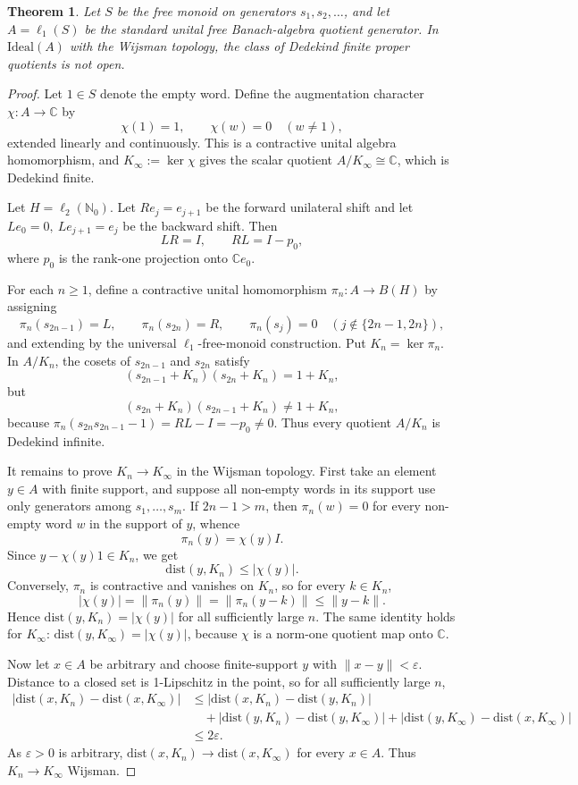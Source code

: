 \documentclass[11pt]{article}
\newtheorem{theorem}{Theorem}
\newcommand{\N}{\mathbb N}
\newcommand{\C}{\mathbb C}
\newcommand{\Ideal}{\mathrm{Ideal}}
\newcommand{\dist}{\mathrm{dist}}
\begin{document}
\begin{theorem}
Let \(S\) be the free monoid on generators \(s_1,s_2,\ldots\), and let
\(A=\ell_1(S)\) be the standard unital free Banach-algebra quotient generator.
In \(\Ideal(A)\) with the Wijsman topology, the class of Dedekind finite
proper quotients is not open.
\end{theorem}

\begin{proof}
Let \(1\in S\) denote the empty word.  Define the augmentation character
\(\chi:A\to\C\) by
\[
        \chi(1)=1,\qquad \chi(w)=0\quad(w\ne 1),
\]
extended linearly and continuously.  This is a contractive unital algebra
homomorphism, and \(K_\infty:=\ker\chi\) gives the scalar quotient
\(A/K_\infty\cong\C\), which is Dedekind finite.

Let \(H=\ell_2(\N_0)\).  Let \(R e_j=e_{j+1}\) be the forward unilateral
shift and let \(L e_0=0,\ L e_{j+1}=e_j\) be the backward shift.  Then
\[
        LR=I,\qquad RL=I-p_0,
\]
where \(p_0\) is the rank-one projection onto \(\C e_0\).

For each \(n\ge 1\), define a contractive unital homomorphism
\(\pi_n:A\to B(H)\) by assigning
\[
        \pi_n(s_{2n-1})=L,\qquad
        \pi_n(s_{2n})=R,\qquad
        \pi_n(s_j)=0\quad(j\notin\{2n-1,2n\}),
\]
and extending by the universal \(\ell_1\)-free-monoid construction.  Put
\(K_n=\ker\pi_n\).  In \(A/K_n\), the cosets of \(s_{2n-1}\) and \(s_{2n}\)
satisfy
\[
        (s_{2n-1}+K_n)(s_{2n}+K_n)=1+K_n,
\]
but
\[
        (s_{2n}+K_n)(s_{2n-1}+K_n)\ne 1+K_n,
\]
because \(\pi_n(s_{2n}s_{2n-1}-1)=RL-I=-p_0\ne0\).  Thus every quotient
\(A/K_n\) is Dedekind infinite.

It remains to prove \(K_n\to K_\infty\) in the Wijsman topology.  First take
an element \(y\in A\) with finite support, and suppose all non-empty words in
its support use only generators among \(s_1,\ldots,s_m\).  If \(2n-1>m\), then
\(\pi_n(w)=0\) for every non-empty word \(w\) in the support of \(y\), whence
\[
        \pi_n(y)=\chi(y)I.
\]
Since \(y-\chi(y)1\in K_n\), we get
\[
        \dist(y,K_n)\le |\chi(y)|.
\]
Conversely, \(\pi_n\) is contractive and vanishes on \(K_n\), so for every
\(k\in K_n\),
\[
        |\chi(y)|=\|\pi_n(y)\|=\|\pi_n(y-k)\|\le \|y-k\|.
\]
Hence \(\dist(y,K_n)=|\chi(y)|\) for all sufficiently large \(n\).  The same
identity holds for \(K_\infty\): \(\dist(y,K_\infty)=|\chi(y)|\), because
\(\chi\) is a norm-one quotient map onto \(\C\).

Now let \(x\in A\) be arbitrary and choose finite-support \(y\) with
\(\|x-y\|<\varepsilon\).  Distance to a closed set is 1-Lipschitz in the
point, so for all sufficiently large \(n\),
\[
\begin{aligned}
|\dist(x,K_n)-\dist(x,K_\infty)|
&\le |\dist(x,K_n)-\dist(y,K_n)| \\
&\quad + |\dist(y,K_n)-\dist(y,K_\infty)|
      + |\dist(y,K_\infty)-\dist(x,K_\infty)| \\
&\le 2\varepsilon .
\end{aligned}
\]
As \(\varepsilon>0\) is arbitrary, \(\dist(x,K_n)\to\dist(x,K_\infty)\) for
every \(x\in A\).  Thus \(K_n\to K_\infty\) Wijsman.


\end{proof}
\end{document}
